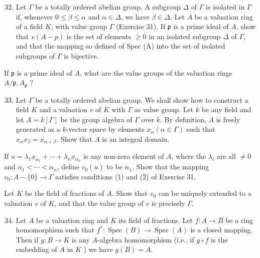 \documentclass{standalone}
\theoremstyle{definition}
\theoremstyle{remark}
\begin{document}
\begin{enumerate}
  \setcounter{enumi}{31}
  \item Let $\Gamma$ be a totally ordered abelian group. A subgroup $\Delta$ of $\Gamma$ is isolated in $\Gamma$ if, whenever $0 \leqslant \beta \leqslant \alpha$ and $\alpha \in \Delta$, we have $\beta \in \Delta$. Let $A$ be a valuation ring of a field $K$, with value group $\Gamma$ (Exercise 31). If $\mathfrak{p}$ is a prime ideal of $A$, show that $v(A-p)$ is the set of elements $\geqslant 0$ in an isolated subgroup $\Delta$ of $\Gamma$, and that the mapping so defined of Spec (A) into the set of isolated subgroups of $\Gamma$ is bijective.
\end{enumerate}

If $\mathfrak{p}$ is a prime ideal of $A$, what are the value groups of the valuation rings $A / \mathfrak{p}, A_{\mathfrak{p}}$ ?

\begin{enumerate}
  \setcounter{enumi}{32}
  \item Let $\Gamma$ be a totally ordered abelian group. We shall show how to construct a field $K$ and a valuation $v$ of $K$ with $\Gamma$ as value group. Let $k$ be any field and let $A=k[\Gamma]$ be the group algebra of $\Gamma$ over $k$. By definition, $A$ is freely generated as a $k$-vector space by elements $x_{\alpha}(\alpha \in \Gamma)$ such that $x_{\alpha} x_{\beta}=x_{\alpha+\beta}$. Show that $A$ is an integral domain.
\end{enumerate}

If $u=\lambda_{1} x_{\alpha_{1}}+\cdots+\lambda_{n} x_{\alpha_{n}}$ is any non-zero element of $A$, where the $\lambda_{i}$ are all $\neq 0$ and $\alpha_{1}<\cdots<\alpha_{n}$, define $v_{0}(u)$ to be $\alpha_{1}$. Show that the mapping $v_{0}: A-\{0\} \rightarrow \Gamma$ satisfies conditions (1) and (2) of Exercise 31.

Let $K$ be the field of fractions of $A$. Show that $v_{0}$ can be uniquely extended to a valuation $v$ of $K$, and that the value group of $v$ is precisely $\Gamma$.

\begin{enumerate}
  \setcounter{enumi}{33}
  \item Let $A$ be a valuation ring and $K$ its field of fractions. Let $f: A \rightarrow B$ be a ring homomorphism such that $f^{*}: \operatorname{Spec}(B) \rightarrow \operatorname{Spec}(A)$ is a closed mapping. Then if $g: B \rightarrow K$ is any $A$-algebra homomorphism (i.e., if $g \circ f$ is the embedding of $A$ in $K$ ) we have $g(B)=A$.
\end{enumerate}
\end{document}
